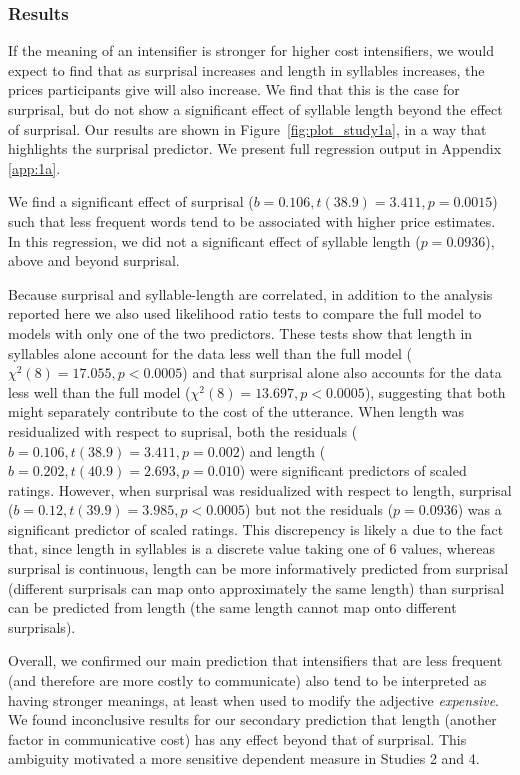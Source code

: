 \subsubsection{Results}

If the meaning of an intensifier is stronger for higher cost intensifiers, we would expect to find that as surprisal increases and length in syllables increases, the prices participants give will also increase. 
We find that this is the case for surprisal, but do not show a significant effect of syllable length beyond the effect of surprisal.
Our results are shown in Figure~\ref{fig:plot_study1a}, in a way that highlights the surprisal predictor.
We present full regression output in Appendix \ref{app:1a}.

We find a significant effect of surprisal ($b=0.106,t(38.9)=3.411,p=0.0015$) such that less frequent words tend to be associated with higher price estimates.
In this regression, we did not a significant effect of syllable length ($p=0.0936$), above and beyond surprisal.

Because surprisal and syllable-length are correlated, in addition to the analysis reported here we also used likelihood ratio tests to compare the full model to models with only one of the two predictors.
These tests show that length in syllables alone account for the data less well than the full model ($\chi^2(8)=17.055, p<0.0005$) and that surprisal alone also accounts for the data less well than the full model ($\chi^2(8)=13.697, p<0.0005$), suggesting that both might separately contribute to the cost of the utterance.
When length was residualized with respect to suprisal, both the residuals ($b=0.106,t(38.9)=3.411,p=0.002$) and length ($b=0.202,t(40.9)=2.693,p=0.010$) were significant predictors of scaled ratings. However, when surprisal was residualized with respect to length, surprisal ($b=0.12, t(39.9)=3.985, p<0.0005$) but not the residuals ($p=0.0936$) was a significant predictor of scaled ratings. This discrepency is likely a due to the fact that, since length in syllables is a discrete value taking one of 6 values, whereas surprisal is continuous, length can be more informatively predicted from surprisal (different surprisals can map onto approximately the same length) than surprisal can be predicted from length (the same length cannot map onto different surprisals).

Overall, we confirmed our main prediction that intensifiers that are less frequent (and therefore are more costly to communicate) also tend to be interpreted as having stronger meanings, at least when used to modify the adjective \emph{expensive}.
We found inconclusive results for our secondary prediction that length (another factor in communicative cost) has any effect beyond that of surprisal.
This ambiguity motivated a more sensitive dependent measure in Studies 2 and 4.

